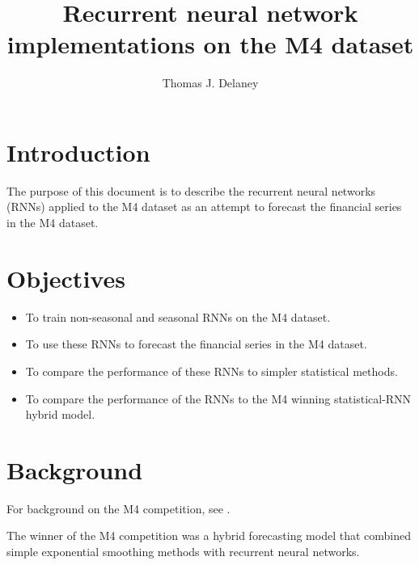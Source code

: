 \documentclass[a4paper,12pt]{article}
\title{Recurrent neural network implementations on the M4 dataset}
\date{}
\author{Thomas J. Delaney}
\theoremstyle{definition}
\begin{document}
\maketitle

\tableofcontents

\newpage

\section{Introduction}
The purpose of this document is to describe the recurrent neural networks (RNNs) applied to the M4 dataset as an attempt to forecast the financial series in the M4 dataset.

\section{Objectives}
\begin{itemize}
  \item To train non-seasonal and seasonal RNNs on the M4 dataset.
  \item To use these RNNs to forecast the financial series in the M4 dataset.
  \item To compare the performance of these RNNs to simpler statistical methods.
  \item To compare the performance of the RNNs to the M4 winning statistical-RNN hybrid model.
\end{itemize}

\section{Background}
For background on the M4 competition, see \cite{meta}.

The winner of the M4 competition was a hybrid forecasting model that combined simple exponential smoothing methods with recurrent neural networks.

\newpage


\end{document}
